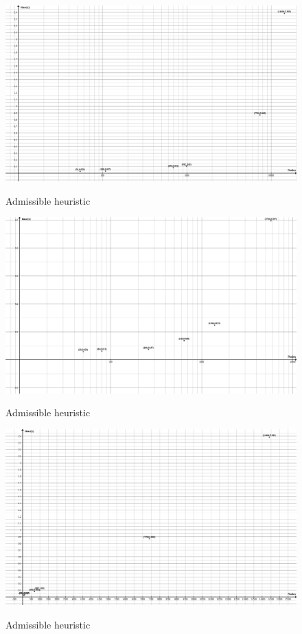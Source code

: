 \documentclass[a4paper,9pt]{article}
\begin{document}
\begin{figure}[H]
	\centering
	\includegraphics[width=\textheight,angle=90]{files/Adm.png}
	\label{fig:adm}
	\caption{Admissible heuristic}
\end{figure}
\begin{figure}[H]
	\centering
	\includegraphics[width=\textheight,angle=90]{files/NonAdm.png}
	\label{fig:nonadm}
	\caption{Admissible heuristic}
\end{figure}
\begin{figure}[H]
	\centering
	\includegraphics[width=\textheight,angle=90]{files/logAdm.png}
	\label{fig:logadm}
	\caption{Admissible heuristic}
\end{figure}
\end{document}
